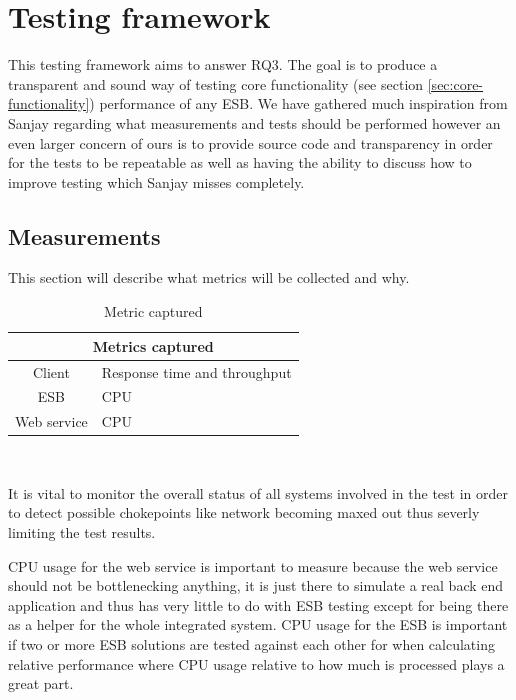\section{Testing framework}
This testing framework aims to answer RQ3. The goal is to produce a transparent and sound way of testing core functionality (see section \ref{sec:core-functionality}) performance of any ESB. 
We have gathered much inspiration from Sanjay \cite{Sanjay2011} regarding what measurements and tests should be performed however an even larger concern of ours is to provide source code and transparency in order for the tests to be repeatable as well as having the ability to discuss how to improve testing which Sanjay misses completely.

\subsection{Measurements}
This section will describe what metrics will be collected and why.\\

\begin{table}[H]
	\caption{Metric captured}
	\begin{tabular}{c l}
		\multicolumn{2}{c}{Metrics captured} \\
		\hline
		Client & Response time and throughput \\
		ESB & CPU \\ 
		Web service &  CPU \\
		\hline
	\end{tabular} \\
\end{table}

It is vital to monitor the overall status of all systems involved in the test in order to detect possible chokepoints like network becoming maxed out thus severly limiting the test results.

CPU usage for the web service is important to measure because the web service should not be bottlenecking anything, it is just there to simulate a real back end application and thus has very little to do with ESB testing except for being there as a helper for the whole integrated system.
CPU usage for the ESB is important if two or more ESB solutions are tested against each other for when calculating relative performance where CPU usage relative to how much is processed plays a great part.


